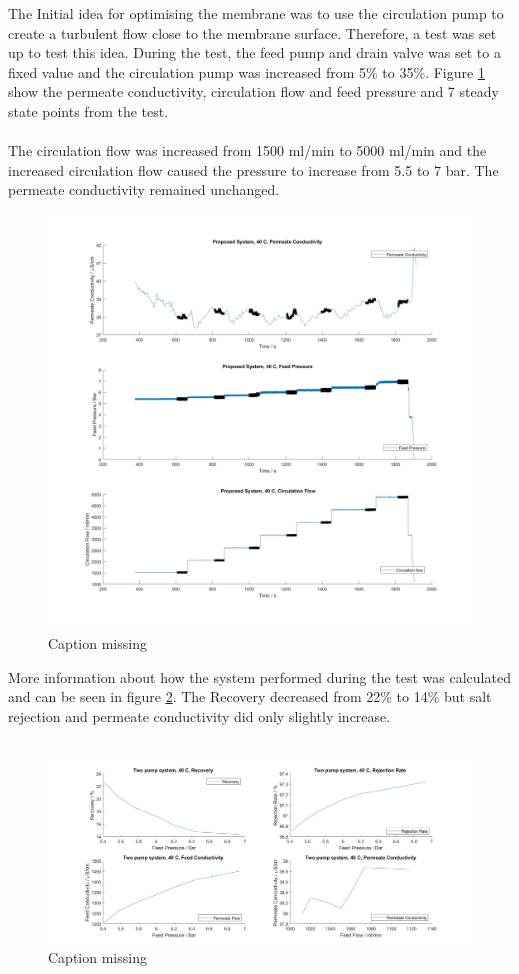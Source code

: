 The Initial idea for optimising the membrane was to use the circulation pump to create a turbulent flow close to the membrane surface. Therefore, a test was set up to test this idea.
During the test, the feed pump and drain valve was set to a fixed value and the circulation pump was increased from 5\% to 35\%. Figure \ref{fig:RecIncrease40} show the permeate conductivity, circulation flow and feed pressure and 7 steady state points from the test.\\
\\
The circulation flow was increased from 1500 ml/min to 5000 ml/min and the increased circulation flow caused the pressure to increase from 5.5 to 7 bar. The permeate conductivity remained unchanged. 
\begin{figure}[H]
    \centering
    \includegraphics[width=1\textwidth]{RecIncrease40}
    \caption{Caption missing}
    \label{fig:RecIncrease40}
\end{figure}  
More information about how the system performed during the test was calculated and can be seen in figure \ref{fig:RecIncreaseKey40}. The Recovery decreased from 22\% to 14\%  but salt rejection and permeate conductivity did only slightly increase. \\
\\
\begin{figure}[H]
    \centering
    \includegraphics[width=1.1\textwidth]{RecIncrease40Key}
    \caption{Caption missing}
    \label{fig:RecIncreaseKey40}
\end{figure} 
